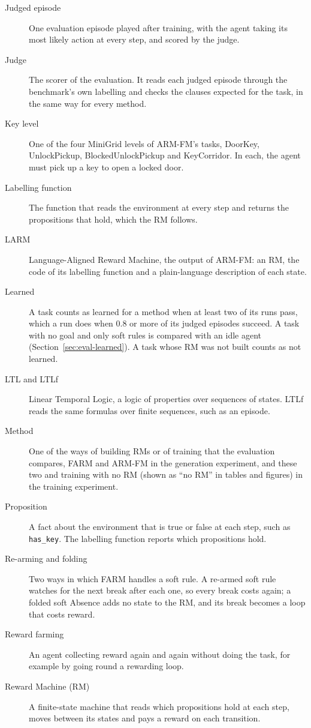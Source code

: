 \documentclass[11pt,english,listoffigures,listoftables]{tfgetsinf}
\begin{document}
\begin{description}
    \item[Judged episode] One evaluation episode played after training, with the agent taking its most likely action at every step, and scored by the judge.
    \item[Judge] The scorer of the evaluation. It reads each judged episode through the benchmark's own labelling and checks the clauses expected for the task, in the same way for every method.
    \item[Key level] One of the four MiniGrid levels of ARM-FM's tasks, DoorKey, UnlockPickup, BlockedUnlockPickup and KeyCorridor. In each, the agent must pick up a key to open a locked door.
    \item[Labelling function] The function that reads the environment at every step and returns the propositions that hold, which the RM follows.
    \item[LARM] Language-Aligned Reward Machine, the output of ARM-FM: an RM, the code of its labelling function and a plain-language description of each state.
    \item[Learned] A task counts as learned for a method when at least two of its runs pass, which a run does when 0.8 or more of its judged episodes succeed. A task with no goal and only soft rules is compared with an idle agent (Section~\ref{sec:eval-learned}). A task whose RM was not built counts as not learned.
    \item[LTL and LTLf] Linear Temporal Logic, a logic of properties over sequences of states. LTLf reads the same formulas over finite sequences, such as an episode.
    \item[Method] One of the ways of building RMs or of training that the evaluation compares, FARM and ARM-FM in the generation experiment, and these two and training with no RM (shown as ``no RM'' in tables and figures) in the training experiment.
    \item[Proposition] A fact about the environment that is true or false at each step, such as \texttt{has\_key}. The labelling function reports which propositions hold.
    \item[Re-arming and folding] Two ways in which FARM handles a soft rule. A re-armed soft rule watches for the next break after each one, so every break costs again; a folded soft Absence adds no state to the RM, and its break becomes a loop that costs reward.
    \item[Reward farming] An agent collecting reward again and again without doing the task, for example by going round a rewarding loop.
    \item[Reward Machine (RM)] A finite-state machine that reads which propositions hold at each step, moves between its states and pays a reward on each transition.

\end{description}
\end{document}
